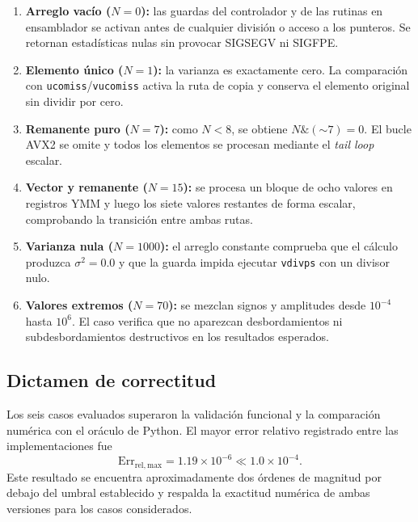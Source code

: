 \documentclass[journal]{IEEEtran}
\begin{document}
\begin{enumerate}
  \item \textbf{Arreglo vacío ($N=0$):} las guardas del controlador y de las
  rutinas en ensamblador se activan antes de cualquier división o acceso a los
  punteros. Se retornan estadísticas nulas sin provocar SIGSEGV ni SIGFPE.

  \item \textbf{Elemento único ($N=1$):} la varianza es exactamente cero. La
  comparación con \texttt{ucomiss}/\texttt{vucomiss} activa la ruta de copia y
  conserva el elemento original sin dividir por cero.

  \item \textbf{Remanente puro ($N=7$):} como $N<8$, se obtiene
  $N\mathbin{\&}(\mathord{\sim}7)=0$. El bucle AVX2 se omite y todos los
  elementos se procesan mediante el \textit{tail loop} escalar.

  \item \textbf{Vector y remanente ($N=15$):} se procesa un bloque de ocho
  valores en registros YMM y luego los siete valores restantes de forma
  escalar, comprobando la transición entre ambas rutas.

  \item \textbf{Varianza nula ($N=1000$):} el arreglo constante comprueba que
  el cálculo produzca $\sigma^2=0.0$ y que la guarda impida ejecutar
  \texttt{vdivps} con un divisor nulo.

  \item \textbf{Valores extremos ($N=70$):} se mezclan signos y amplitudes
  desde $10^{-4}$ hasta $10^6$. El caso verifica que no aparezcan
  desbordamientos ni subdesbordamientos destructivos en los resultados
  esperados.
\end{enumerate}

\subsection{Dictamen de correctitud}

Los seis casos evaluados superaron la validación funcional y la comparación
numérica con el oráculo de Python. El mayor error relativo registrado entre las
implementaciones fue
\begin{equation}
  \mathrm{Err}_{\mathrm{rel,max}}=1.19\times10^{-6}
  \ll 1.0\times10^{-4}.
  \label{eq:max-relative-error}
\end{equation}
Este resultado se encuentra aproximadamente dos órdenes de magnitud por debajo
del umbral establecido y respalda la exactitud numérica de ambas versiones para
los casos considerados.
\end{document}
